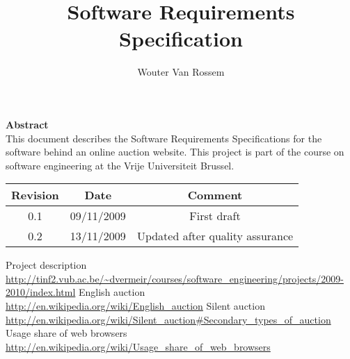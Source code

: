 \documentclass{report}
\begin{document}
\title{Software Requirements Specification}
\author{Wouter Van Rossem}

\maketitle
\begin{center}
	\textbf{Abstract} \\
	This document describes the Software Requirements Specifications for
	the software behind an online auction website. This project is part of 
	the course on software engineering at the Vrije Universiteit Brussel.
	\bigskip
\begin{tabular}{|c|c|c|}
	\hline  \textbf{Revision} & \textbf{Date} & \textbf{Comment} \\ 
	\hline 0.1 & 09/11/2009 & First draft \\ 
	\hline 0.2 & 13/11/2009 & Updated after quality assurance \\ 
	\hline 
\end{tabular} 
\end{center}
\tableofcontents








\begin{thebibliography}{9}
 Project description \\
	\url{http://tinf2.vub.ac.be/~dvermeir/courses/software_engineering/projects/2009-2010/index.html}
 English auction \\ 
	\url{http://en.wikipedia.org/wiki/English_auction}
 Silent auction \\
	\url{http://en.wikipedia.org/wiki/Silent_auction#Secondary_types_of_auction}
 Usage share of web browsers \\
	\url{http://en.wikipedia.org/wiki/Usage_share_of_web_browsers}
\end{thebibliography}

\end{document}
